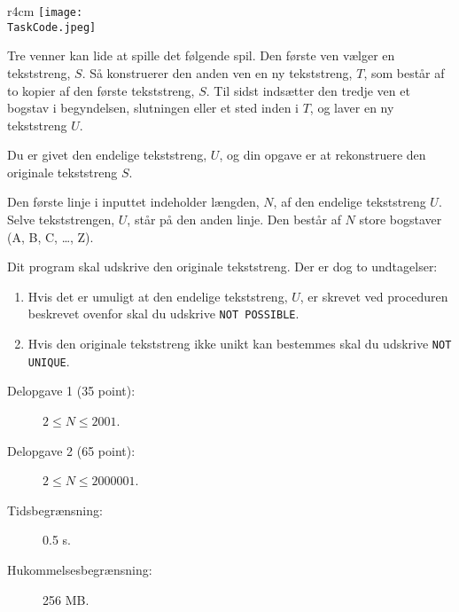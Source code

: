 \documentclass{boi2014-dk}
\renewcommand{\TaskCode}{friends}
\begin{document}
    \begin{wrapfigure}{r}{4cm}
        \vspace{-24pt}
		\texttt{[image: \\TaskCode.jpeg]}
	\end{wrapfigure}
	Tre venner kan lide at spille det følgende spil.
	Den første ven vælger en tekststreng, $S$.
	Så konstruerer den anden ven en ny tekststreng, $T$, som
	består af to kopier af den første tekststreng, $S$.
	Til sidst indsætter den tredje ven et bogstav i begyndelsen, slutningen
    eller et sted inden i $T$, og laver en ny tekststreng $U$.

    \Task
    Du er givet den endelige tekststreng, $U$, og din
    opgave er at rekonstruere den originale tekststreng $S$.

    \Input
    Den første linje i inputtet indeholder længden, $N$, af den
    endelige tekststreng $U$.
	Selve tekststrengen, $U$, står på den anden linje.
    Den består af $N$ store bogstaver (A, B, C, \ldots, Z).

    \Output
	Dit program skal udskrive den originale tekststreng.
	Der er dog to undtagelser:
    \begin{enumerate}
    	\item Hvis det er umuligt at den endelige tekststreng, $U$, er
    	skrevet ved proceduren beskrevet ovenfor skal du udskrive
    	 {\tt NOT POSSIBLE}.
    	\item Hvis den originale tekststreng ikke unikt kan bestemmes
    	skal du udskrive {\tt NOT UNIQUE}.
    \end{enumerate}


    \Examples


    \Scoring

    \begin{description}
        \item[Delopgave 1 (35 point):] $2 \le N \le 2001$.
        \item[Delopgave 2 (65 point):] $2 \le N \le 2000001$.
    \end{description}

    \Constraints

    \begin{description}
        \item[Tidsbegrænsning:] 0.5 s.
        \item[Hukommelsesbegrænsning:] 256 MB.
    \end{description}
\end{document}
